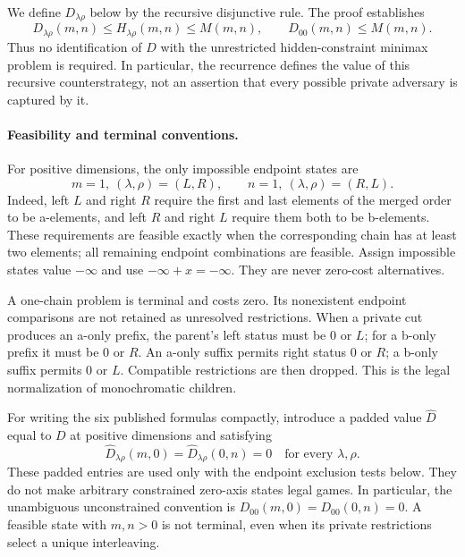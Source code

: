 \documentclass[11pt]{article}
\theoremstyle{definition}
\theoremstyle{remark}
\begin{document}
We define $D_{\lambda\rho}$ below by the recursive disjunctive rule.  The
proof establishes
\begin{equation}
 D_{\lambda\rho}(m,n)\le H_{\lambda\rho}(m,n)\le M(m,n),
 \qquad D_{00}(m,n)\le M(m,n).
 \label{eq:disjunctive-soundness}
\end{equation}
Thus no identification of $D$ with the unrestricted hidden-constraint
minimax problem is required.  In particular, the recurrence defines the
value of this recursive counterstrategy, not an assertion that every
possible private adversary is captured by it.

\paragraph{Feasibility and terminal conventions.}
For positive dimensions, the only impossible endpoint states are
\begin{equation}
 m=1,\ (\lambda,\rho)=(L,R),\qquad
 n=1,\ (\lambda,\rho)=(R,L).
 \label{eq:infeasible-game-states}
\end{equation}
Indeed, left $L$ and right $R$ require the first and last elements of the
merged order to be a-elements, and left $R$ and right $L$ require them
both to be b-elements.  These requirements are feasible exactly when the
corresponding chain has at least two elements; all remaining endpoint
combinations are feasible.  Assign impossible states value $-\infty$ and
use $-\infty+x=-\infty$.  They are never zero-cost alternatives.

A one-chain problem is terminal and costs zero.  Its nonexistent endpoint
comparisons are not retained as unresolved restrictions.  When a private
cut produces an a-only prefix, the parent's left status must be $0$ or
$L$; for a b-only prefix it must be $0$ or $R$.  An a-only suffix permits
right status $0$ or $R$; a b-only suffix permits $0$ or $L$.  Compatible
restrictions are then dropped.  This is the legal normalization of
monochromatic children.

For writing the six published formulas compactly, introduce a padded
value $\widehat D$ equal to $D$ at positive dimensions and satisfying
\[
 \widehat D_{\lambda\rho}(m,0)
 =\widehat D_{\lambda\rho}(0,n)=0
 \quad\text{for every }\lambda,\rho.
\]
These padded entries are used only with the endpoint exclusion tests
below.  They do not make arbitrary constrained zero-axis states legal
games.  In particular, the unambiguous unconstrained convention is
$D_{00}(m,0)=D_{00}(0,n)=0$.  A feasible state with $m,n>0$ is not terminal,
even when its private restrictions select a unique interleaving.
\end{document}
